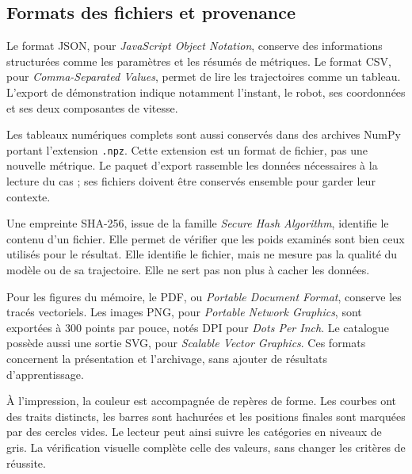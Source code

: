 \subsection{Formats des fichiers et provenance}
Le format JSON, pour \textit{JavaScript Object Notation}, conserve des informations structurées comme les paramètres et les résumés de métriques. Le format CSV, pour \textit{Comma-Separated Values}, permet de lire les trajectoires comme un tableau. L'export de démonstration indique notamment l'instant, le robot, ses coordonnées et ses deux composantes de vitesse.

Les tableaux numériques complets sont aussi conservés dans des archives NumPy portant l'extension \texttt{.npz}. Cette extension est un format de fichier, pas une nouvelle métrique. Le paquet d'export rassemble les données nécessaires à la lecture du cas ; ses fichiers doivent être conservés ensemble pour garder leur contexte.

Une empreinte SHA-256, issue de la famille \textit{Secure Hash Algorithm}, identifie le contenu d'un fichier. Elle permet de vérifier que les poids examinés sont bien ceux utilisés pour le résultat. Elle identifie le fichier, mais ne mesure pas la qualité du modèle ou de sa trajectoire. Elle ne sert pas non plus à cacher les données.

Pour les figures du mémoire, le PDF, ou \textit{Portable Document Format}, conserve les tracés vectoriels. Les images PNG, pour \textit{Portable Network Graphics}, sont exportées à 300 points par pouce, notés DPI pour \textit{Dots Per Inch}. Le catalogue possède aussi une sortie SVG, pour \textit{Scalable Vector Graphics}. Ces formats concernent la présentation et l'archivage, sans ajouter de résultats d'apprentissage.

À l'impression, la couleur est accompagnée de repères de forme. Les courbes ont des traits distincts, les barres sont hachurées et les positions finales sont marquées par des cercles vides. Le lecteur peut ainsi suivre les catégories en niveaux de gris. La vérification visuelle complète celle des valeurs, sans changer les critères de réussite.

